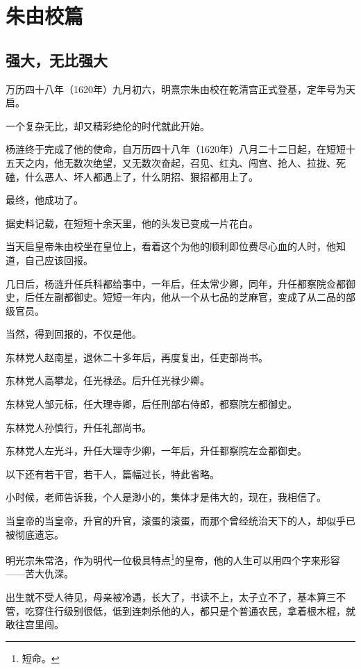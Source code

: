 \chapter*{朱由校篇}
\section{强大，无比强大}
\ifnum{}
	\begin{multicols}{\theparacolNo}
		\fi
		万历四十八年（1620年）九月初六，明熹宗朱由校在乾清宫正式登基，定年号为天启。

		一个复杂无比，却又精彩绝伦的时代就此开始。

		杨涟终于完成了他的使命，自万历四十八年（1620年）八月二十二日起，在短短十五天之内，他无数次绝望，又无数次奋起，召见、红丸、闯宫、抢人、拉拢、死磕，什么恶人、坏人都遇上了，什么阴招、狠招都用上了。

		最终，他成功了。

		据史料记载，在短短十余天里，他的头发已变成一片花白。

		当天启皇帝朱由校坐在皇位上，看着这个为他的顺利即位费尽心血的人时，他知道，自己应该回报。

		几日后，杨涟升任兵科都给事中，一年后，任太常少卿，同年，升任都察院佥都御史，后任左副都御史。短短一年内，他从一个从七品的芝麻官，变成了从二品的部级官员。

		当然，得到回报的，不仅是他。

		东林党人赵南星，退休二十多年后，再度复出，任吏部尚书。

		东林党人高攀龙，任光禄丞。后升任光禄少卿。

		东林党人邹元标，任大理寺卿，后任刑部右侍郎，都察院左都御史。

		东林党人孙慎行，升任礼部尚书。

		东林党人左光斗，升任大理寺少卿，一年后，升任都察院左佥都御史。

		以下还有若干官，若干人，篇幅过长，特此省略。

		小时候，老师告诉我，个人是渺小的，集体才是伟大的，现在，我相信了。

		当皇帝的当皇帝，升官的升官，滚蛋的滚蛋，而那个曾经统治天下的人，却似乎已被彻底遗忘。

		明光宗朱常洛，作为明代一位极具特点\footnote{短命。}的皇帝，他的人生可以用四个字来形容——苦大仇深。

		出生就不受人待见，母亲被冷遇，长大了，书读不上，太子立不了，基本算三不管，吃穿住行级别很低，低到连刺杀他的人，都只是个普通农民，拿着根木棍，就敢往宫里闯。


\end{multicols}
